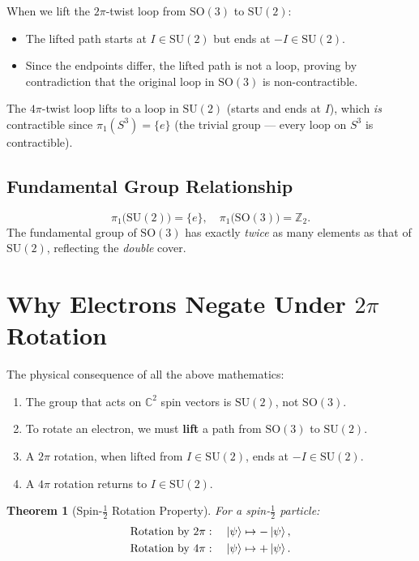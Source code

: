 \documentclass[11pt,a4paper]{article}
\theoremstyle{definition}
\theoremstyle{plain}
\newtheorem{theorem}{Theorem}[section]
\theoremstyle{remark}
\begin{document}
When we lift the $2\pi$-twist loop from $\mathrm{SO}(3)$ to $\mathrm{SU}(2)$:
\begin{itemize}
    \item The lifted path starts at $I \in \mathrm{SU}(2)$ but ends at $-I \in \mathrm{SU}(2)$.
    \item Since the endpoints differ, the lifted path is not a loop, proving by contradiction that the original loop in $\mathrm{SO}(3)$ is non-contractible.
\end{itemize}

The $4\pi$-twist loop lifts to a loop in $\mathrm{SU}(2)$ (starts and ends at $I$), which \emph{is} contractible since $\pi_1(S^3) = \{e\}$ (the trivial group --- every loop on $S^3$ is contractible).

\subsection{Fundamental Group Relationship}

\[
    \pi_1\bigl(\mathrm{SU}(2)\bigr) = \{e\}, \quad \pi_1\bigl(\mathrm{SO}(3)\bigr) = \mathbb{Z}_2.
\]
The fundamental group of $\mathrm{SO}(3)$ has exactly \emph{twice} as many elements as that of $\mathrm{SU}(2)$, reflecting the \emph{double} cover.

\section{Why Electrons Negate Under $2\pi$ Rotation}

The physical consequence of all the above mathematics:

\begin{enumerate}
    \item The group that acts on $\mathbb{C}^2$ spin vectors is $\mathrm{SU}(2)$, not $\mathrm{SO}(3)$.
    \item To rotate an electron, we must \textbf{lift} a path from $\mathrm{SO}(3)$ to $\mathrm{SU}(2)$.
    \item A $2\pi$ rotation, when lifted from $I \in \mathrm{SU}(2)$, ends at $-I \in \mathrm{SU}(2)$.
    \item A $4\pi$ rotation returns to $I \in \mathrm{SU}(2)$.
\end{enumerate}

\begin{theorem}[Spin-$\frac{1}{2}$ Rotation Property]
    For a spin-$\frac{1}{2}$ particle:
    \begin{align}
        \text{Rotation by } 2\pi &:\quad \ket{\psi} \mapsto -\ket{\psi}, \\
        \text{Rotation by } 4\pi &:\quad \ket{\psi} \mapsto +\ket{\psi}.
    \end{align}
\end{theorem}
\end{document}
